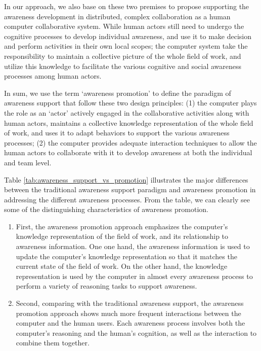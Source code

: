 In our approach, we also base on these two premises to propose supporting the awareness development in distributed, complex collaboration as a human computer collaborative system. While human actors still need to undergo the cognitive processes to develop individual awareness, and use it to make decision and perform activities in their own local scopes; the computer system take the responsibility to maintain a collective picture of the whole field of work, and utilize this knowledge to facilitate the various cognitive and social awareness processes among human actors.

In sum, we use the term `awareness promotion' to define the paradigm of awareness support that follow these two design principles: (1) the computer plays the role as an `actor' actively engaged in the collaborative activities along with human actors, maintains a collective knowledge representation of the whole field of work, and uses it to adapt behaviors to support the various awareness processes; (2) the computer provides adequate interaction techniques to allow the human actors to collaborate with it to develop awareness at both the individual and team level. 

Table \ref{tab:awareness_support_vs_promotion} illustrates the major differences between the traditional awareness support paradigm and awareness promotion in addressing the different awareness processes. From the table, we can clearly see some of the distinguishing characteristics of awareness promotion. 

\begin{enumerate}
   \item First, the awareness promotion approach emphasizes the computer's knowledge representation of the field of work, and its relationship to awareness information. One one hand, the awareness information is used to update the computer's knowledge representation so that it matches the current state of the field of work. On the other hand, the knowledge representation is used by the computer in almost every awareness process to perform a variety of reasoning tasks to support awareness.
   \item Second, comparing with the traditional awareness support, the awareness promotion approach shows much more frequent interactions between the computer and the human users. Each awareness process involves both the computer's reasoning and the human's cognition, as well as the interaction to combine them together. 
\end{enumerate} 

